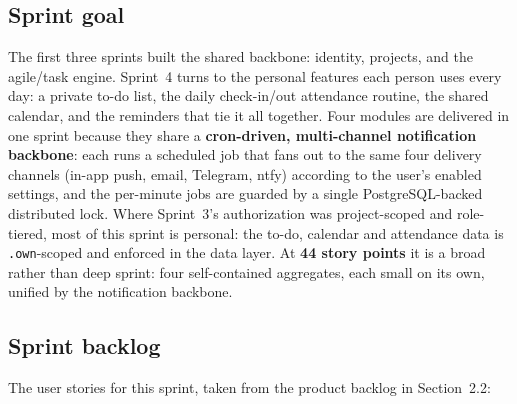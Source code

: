 \subsection{Sprint goal}

The first three sprints built the shared backbone: identity, projects, and the agile/task
engine. Sprint~4 turns to the personal features each person uses every day: a private
to-do list, the daily check-in/out attendance routine, the shared calendar, and the reminders
that tie it all together. Four modules are delivered in one sprint because they share a
\textbf{cron-driven, multi-channel notification backbone}: each runs a scheduled job that fans
out to the same four delivery channels (in-app push, email, Telegram, ntfy) according to the
user's enabled settings, and the per-minute jobs are guarded by a single PostgreSQL-backed
distributed lock. Where Sprint~3's authorization was project-scoped and role-tiered, most of
this sprint is personal: the to-do, calendar and attendance data is \texttt{.own}-scoped and
enforced in the data layer. At \textbf{44 story points} it is a broad rather than deep sprint:
four self-contained aggregates, each small on its own, unified by the notification backbone.

\subsection{Sprint backlog}

The user stories for this sprint, taken from the product backlog in Section~2.2:

